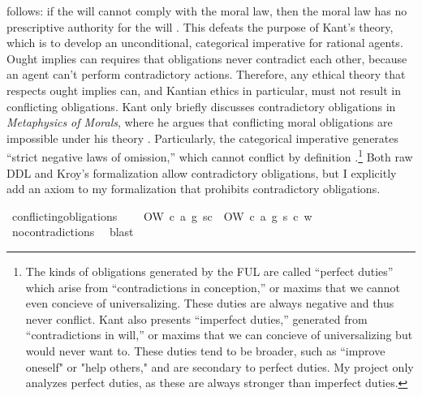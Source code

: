\begin{isabellebody}
\begin{isamarkuptext}
follows: if the will cannot comply with the moral law, then the moral law has no prescriptive authority 
for the will \citep[703-4]{kohl}. This defeats the purpose of Kant's theory, which is to develop an unconditional, categorical imperative 
for rational agents. Ought implies can requires that obligations never contradict each other, because an agent 
can't perform contradictory actions. Therefore, any ethical theory that respects ought implies can, 
and Kantian ethics in particular, must not result in conflicting obligations. 
Kant only briefly discusses contradictory obligations in \emph{Metaphysics of Morals}, where he argues that 
conflicting moral obligations are impossible under his theory \citep[V224]{metaphysicsintro}. Particularly, the categorical imperative generates 
``strict negative laws of omission,'' which cannot conflict by definition \citep[45]{timmerman}.\footnote{The 
kinds of obligations generated by the FUL are called ``perfect duties'' which arise from ``contradictions 
in conception,'' or maxims that we cannot even concieve of universalizing. These duties are always negative 
and thus never conflict. Kant also presents ``imperfect duties,'' generated from ``contradictions in will,''
or maxims that we can concieve of universalizing but would never want to. These duties tend to be broader, 
such as ``improve oneself" or "help others," and are secondary to perfect duties. My project only analyzes 
perfect duties, as these are always stronger than imperfect duties.} Both raw DDL and 
Kroy's formalization allow contradictory obligations, but I explicitly add an axiom to my formalization
that prohibits contradictory obligations.%
\end{isamarkuptext}\isamarkuptrue%
\isamarkupfalse%
\ conflicting{\isacharunderscore}obligations{\isacharcolon}\isanewline
\ \ \ {\isachardoublequoteopen}{\isasymnot}\ {\isacharparenleft}O{\isacharbraceleft}W\ {\isacharparenleft}c{\isacharcomma}\ a{\isacharcomma}\ g{\isacharparenright}\ s{\isacharbar}c{\isacharbraceright}\ \isactrlbold {\isasymand}\ O{\isacharbraceleft}\isactrlbold {\isasymnot}{\isacharparenleft}W\ {\isacharparenleft}c{\isacharcomma}\ a{\isacharcomma}\ g{\isacharparenright}\ s{\isacharparenright}{\isacharbar}\ c{\isacharbraceright}{\isacharparenright}\ w{\isachardoublequoteclose}\isanewline
%
\isadelimproof
\ \ %
\endisadelimproof
%
\isatagproof
{}\isamarkupfalse%
\ no{\isacharunderscore}contradictions\ \isamarkupfalse%
\ blast\isanewline
%
\end{isabellebody}
